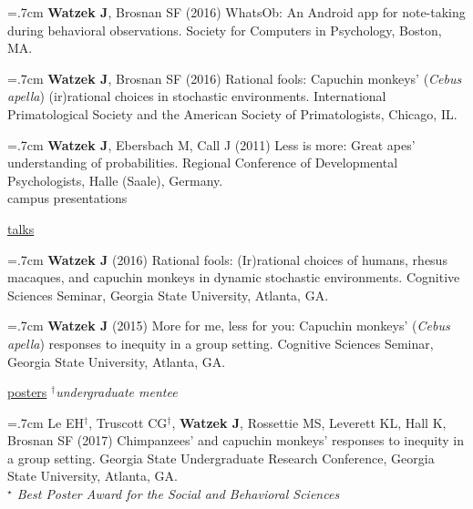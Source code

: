 \documentclass[]{friggeri-cv}
\begin{document}
\hangindent=.7cm \textbf{Watzek J}, Brosnan SF (2016) WhatsOb: An Android app for note-taking during behavioral observations. Society for Computers in Psychology, Boston, MA.

\hangindent=.7cm \textbf{Watzek J}, Brosnan SF (2016) Rational fools: Capuchin monkeys' (\emph{Cebus apella}) (ir)rational choices in stochastic environments. International Primatological Society and the American Society of Primatologists, Chicago, IL.

\hangindent=.7cm \textbf{Watzek J}, Ebersbach M, Call J (2011) Less is more: Great apes' understanding of probabilities. Regional Conference of Developmental Psychologists, Halle (Saale), Germany.\\[.5cm]


{\subfont\large{} campus presentations}


\hspace{.35cm} { \underline{talks}}

\hangindent=.7cm \textbf{Watzek J} (2016) Rational fools: (Ir)rational choices of humans, rhesus macaques, and capuchin monkeys in dynamic stochastic environments. Cognitive Sciences Seminar, Georgia State University, Atlanta, GA.

\hangindent=.7cm \textbf{Watzek J} (2015) More for me, less for you: Capuchin monkeys' (\emph{Cebus apella}) responses to inequity in a group setting. Cognitive Sciences Seminar, Georgia State University, Atlanta, GA.%


\newpage
\thispagestyle{fancy}


\hspace{.35cm} { \underline{posters} \hspace{.35cm} {\small{} \emph{${}^\dagger$undergraduate mentee}}}

\hangindent=.7cm Le EH${}^\dagger$, Truscott CG${}^\dagger$, \textbf{Watzek J}, Rossettie MS, Leverett KL, Hall K, Brosnan SF (2017) Chimpanzees' and capuchin monkeys' responses to inequity in a group setting. Georgia State Undergraduate Research Conference, Georgia State University, Atlanta, GA.\\\hspace{.6cm} \emph{${}^\star$ Best Poster Award for the Social and Behavioral Sciences}
\end{document}
